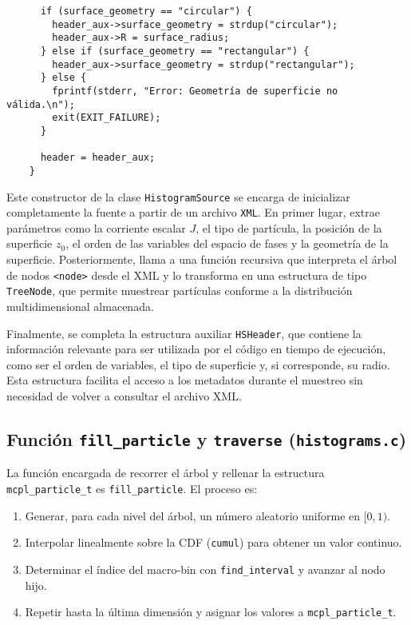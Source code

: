 \begin{verbatim}
      if (surface_geometry == "circular") {
        header_aux->surface_geometry = strdup("circular");
        header_aux->R = surface_radius;
      } else if (surface_geometry == "rectangular") {
        header_aux->surface_geometry = strdup("rectangular");
      } else {
        fprintf(stderr, "Error: Geometría de superficie no válida.\n");
        exit(EXIT_FAILURE);
      }
    
      header = header_aux;
    }
\end{verbatim}
   
\noindent
Este constructor de la clase \texttt{HistogramSource} se encarga de inicializar completamente la fuente a partir de un archivo \texttt{XML}. En primer lugar, extrae parámetros como la corriente escalar \(J\), el tipo de partícula, la posición de la superficie \(z_0\), el orden de las variables del espacio de fases y la geometría de la superficie. Posteriormente, llama a una función recursiva que interpreta el árbol de nodos \texttt{<node>} desde el XML y lo transforma en una estructura de tipo \texttt{TreeNode}, que permite muestrear partículas conforme a la distribución multidimensional almacenada.

Finalmente, se completa la estructura auxiliar \texttt{HSHeader}, que contiene la información relevante para ser utilizada por el código en tiempo de ejecución, como ser el orden de variables, el tipo de superficie y, si corresponde, su radio. Esta estructura facilita el acceso a los metadatos durante el muestreo sin necesidad de volver a consultar el archivo XML.
    

\subsection{Función \texttt{fill\_particle} y \texttt{traverse} (\texttt{histograms.c})}\label{subsec:fill_particle}

La función encargada de recorrer el árbol y rellenar la estructura \texttt{mcpl\_particle\_t} es \texttt{fill\_particle}. El proceso es:

\begin{enumerate}
  \item Generar, para cada nivel del árbol, un número aleatorio uniforme en \([0,1)\).
  \item Interpolar linealmente sobre la CDF (\texttt{cumul}) para obtener un valor continuo.
  \item Determinar el índice del macro-bin con \texttt{find\_interval} y avanzar al nodo hijo.
  \item Repetir hasta la última dimensión y asignar los valores a \texttt{mcpl\_particle\_t}.
\end{enumerate}

